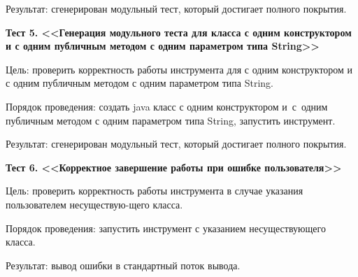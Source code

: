 Результат: сгенерирован модульный тест, который достигает полного покрытия.


\textbf{Тест 5. <<Генерация модульного теста для класса с одним конструктором и с одним публичным методом с одним параметром типа String>>}

Цель: проверить корректность работы инструмента для с одним конструктором и с одним публичным методом с одним параметром типа String.

Порядок проведения: создать java класс с одним конструктором и~с~одним публичным методом с одним параметром типа String, запустить инструмент.

Результат: сгенерирован модульный тест, который достигает полного покрытия.


\textbf{Тест 6. <<Корректное завершение работы при ошибке пользователя>>}

Цель: проверить корректность работы инструмента в случае указания пользователем несуществую-щего класса.

Порядок проведения: запустить инструмент с указанием несуществующего класса.

Результат: вывод ошибки в стандартный поток вывода.